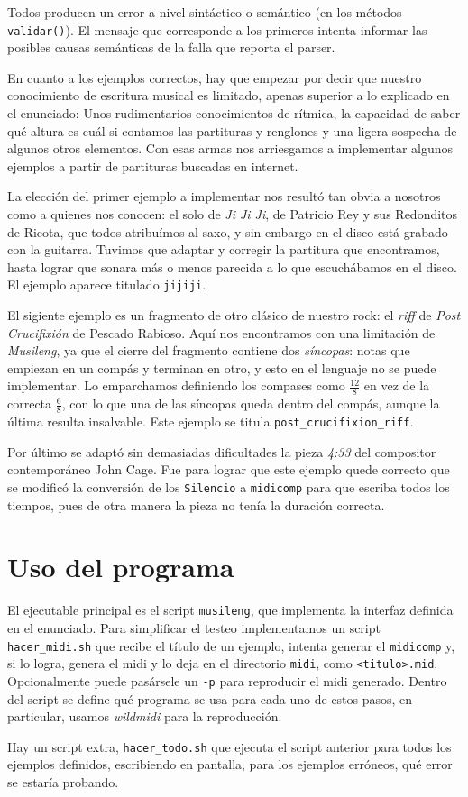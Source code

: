 \documentclass{article}
\begin{document}
Todos producen un error a nivel sintáctico o semántico (en los métodos \texttt{validar()}). El
mensaje que corresponde a los primeros intenta informar las posibles causas semánticas de la falla
que reporta el parser.

En cuanto a los ejemplos correctos, hay que empezar por decir que nuestro conocimiento de escritura
musical es limitado, apenas superior a lo explicado en el enunciado: Unos rudimentarios
conocimientos de rítmica, la capacidad de saber qué altura es cuál si contamos las partituras y
renglones y una ligera sospecha de algunos otros elementos.  Con esas armas nos arriesgamos a
implementar algunos ejemplos a partir de partituras buscadas en internet.

La elección del primer ejemplo a implementar nos resultó tan obvia a nosotros como a quienes nos
conocen: el solo de \emph{Ji Ji Ji}, de Patricio Rey y sus Redonditos de Ricota, que todos atribuímos al
saxo, y sin embargo en el disco está grabado con la guitarra.  Tuvimos que adaptar y corregir la
partitura que encontramos, hasta lograr que sonara más o menos parecida a lo que escuchábamos en el
disco.  El ejemplo aparece titulado \texttt{jijiji}.

El sigiente ejemplo es un fragmento de otro clásico de nuestro rock: el \emph{riff} de
\emph{Post Crucifixión} de Pescado Rabioso.  Aquí nos encontramos con una limitación de
\emph{Musileng}, ya que el cierre del fragmento contiene dos \emph{síncopas}: notas que empiezan en
un compás y terminan en otro, y esto en el lenguaje no se puede implementar.  Lo emparchamos
definiendo los compases como $\frac{12}{8}$ en vez de la correcta $\frac{6}{8}$, con lo que una de las
síncopas queda dentro del compás, aunque la última resulta insalvable.  Este ejemplo se titula
\texttt{post\_crucifixion\_riff}.

Por último se adaptó sin demasiadas dificultades la pieza \emph{4:33} del compositor
contemporáneo John Cage.  Fue para lograr que este ejemplo quede correcto que se modificó la
conversión de los \texttt{Silencio} a \texttt{midicomp} para que escriba todos los tiempos, pues de
otra manera la pieza no tenía la duración correcta.

\section*{Uso del programa}
El ejecutable principal es el script \texttt{musileng}, que implementa la interfaz definida en el
enunciado.  Para simplificar el testeo implementamos un script \texttt{hacer\_midi.sh} que recibe el
título de un ejemplo, intenta generar el \texttt{midicomp} y, si lo logra, genera el midi y lo deja
en el directorio \texttt{midi}, como \texttt{<titulo>.mid}.  Opcionalmente puede pasársele un
\texttt{-p} para reproducir el midi generado.  Dentro del script se define qué programa se usa para
cada uno de estos pasos, en particular, usamos \emph{wildmidi} para la reproducción.

Hay un script extra, \texttt{hacer\_todo.sh} que ejecuta el script anterior para todos los ejemplos
definidos, escribiendo en pantalla, para los ejemplos erróneos, qué error se estaría probando.
\end{document}
